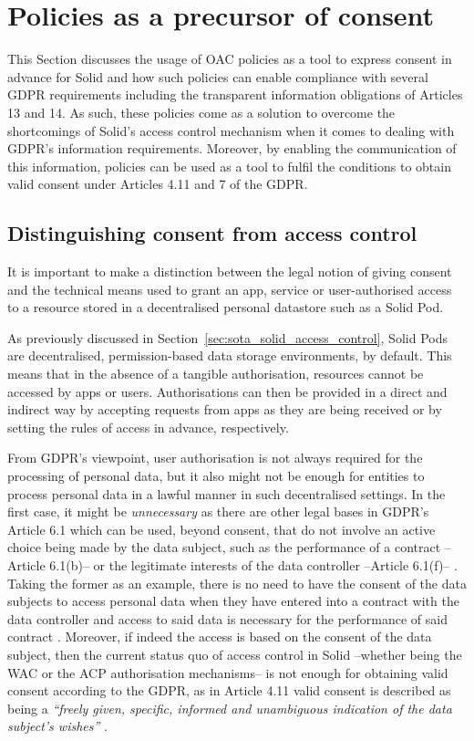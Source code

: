 \section{Policies as a precursor of consent}
\label{sec:policies_consent}

This Section discusses the usage of OAC policies as a tool to express consent in advance for Solid and how such policies can enable compliance with several GDPR requirements including the transparent information obligations of Articles 13 and 14.
As such, these policies come as a solution to overcome the shortcomings of Solid's access control mechanism when it comes to dealing with GDPR's information requirements.
Moreover, by enabling the communication of this information, policies can be used as a tool to fulfil the conditions to obtain valid consent under Articles 4.11 and 7 of the GDPR.

\subsection{Distinguishing consent from access control}
\label{sec:distinction}

It is important to make a distinction between the legal notion of giving consent and the technical means used to grant an app, service or user-authorised access to a resource stored in a decentralised personal datastore such as a Solid Pod.

As previously discussed in Section~\ref{sec:sota_solid_access_control}, Solid Pods are decentralised, permission-based data storage environments, by default.
This means that in the absence of a tangible authorisation, resources cannot be accessed by apps or users.
Authorisations can then be provided in a direct and indirect way by accepting requests from apps as they are being received or by setting the rules of access in advance, respectively.

From GDPR's viewpoint, user authorisation is not always required for the processing of personal data, but it also might not be enough for entities to process personal data in a lawful manner in such decentralised settings.
In the first case, it might be \textit{unnecessary} as there are other legal bases in GDPR's Article 6.1 which can be used, beyond consent, that do not involve an active choice being made by the data subject, such as the performance of a contract --Article 6.1(b)-- or the legitimate interests of the data controller --Article 6.1(f)-- \citep{kranenborg_article_2014}.
Taking the former as an example, there is no need to have the consent of the data subjects to access personal data when they have entered into a contract with the data controller and access to said data is necessary for the performance of said contract \citep{european_data_protection_board_guidelines_2019}.
Moreover, if indeed the access is based on the consent of the data subject, then the current status quo of access control in Solid --whether being the WAC or the ACP authorisation mechanisms-- is not enough for obtaining valid consent according to the GDPR, as in Article 4.11 valid consent is described as being a \textit{``freely given, specific, informed and unambiguous indication of the data subject’s wishes''} \citeyearpar{noauthor_regulation_2016}. 

